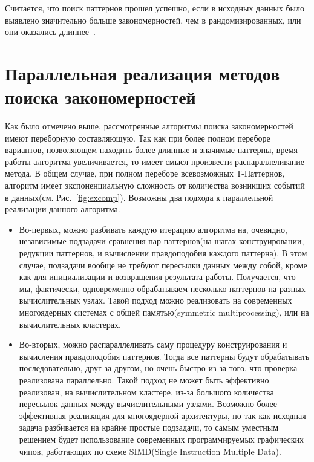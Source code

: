 \documentclass[12pt,fсeqn]{article}
\begin{document}
Считается, что поиск паттернов прошел успешно, если в исходных данных было выявлено значительно больше закономерностей, чем в рандомизированных, 
или они оказались длиннее~\cite{Magnusson}.

\section{Параллельная реализация методов поиска закономерностей}
Как было отмечено выше, рассмотренные алгоритмы поиска закономерностей
имеют переборную составляющую. Так как при более полном переборе вариантов, позволяющем находить
более длинные и значимые паттерны, время работы алгоритма увеличивается, то имеет смысл произвести распараллеливание метода.
В общем случае,
при полном переборе всевозможных Т-Паттернов, алгоритм имеет экспоненциальную сложность от количества
возникших событий в данных(см. Рис.~\ref{fig:excomp}).
Возможны два подхода к параллельной реализации данного алгоритма. 
\begin{itemize}
\item 
Во-первых, можно разбивать каждую итерацию алгоритма на, очевидно,
независимые подзадачи сравнения пар паттернов(на шагах конструировании, редукции паттернов, и
вычислении правдоподобия каждого паттерна). В этом случае, подзадачи вообще не требуют пересылки
данных между собой, кроме как для инициализации и возвращения результата работы. Получается, что
мы, фактически, одновременно обрабатываем несколько паттернов на разных вычислительных узлах. Такой 
подход можно реализовать на современных многоядерных системах с общей памятью(symmetric multiprocessing),
или на вычислительных кластерах. 
\item 
Во-вторых, можно распараллеливать саму процедуру конструирования и 
вычисления правдоподобия паттернов. Тогда все паттерны будут обрабатывать последовательно, друг за другом,
но очень быстро из-за того, что проверка реализована параллельно. Такой подход не может быть эффективно реализован,
на вычислительном кластере, из-за большого количества пересылок данных между вычислительными узлами. Возможно более
эффективная реализация для многоядерной архитектуры, но так как исходная задача разбивается на крайне простые 
подзадачи, то самым уместным решением будет использование современных программируемых графических чипов, 
работающих по схеме SIMD(Single Instruction Multiple Data). 
\end{itemize}
\end{document}
